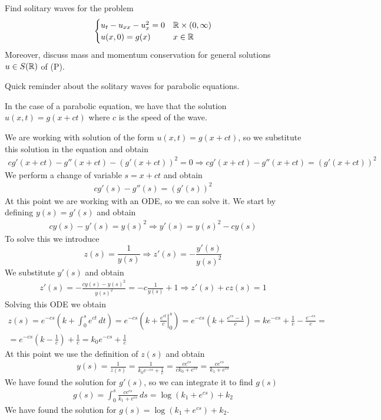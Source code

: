 \newpage
\begin{exercise}
    Find solitary waves for the problem
    \[
        \begin{cases}
            u_t - u_{xx} - u_x^2 = 0 & \mathbb{R} \times (0, \infty) \\
            u(x, 0) = g(x)           & x \in \mathbb{R}
        \end{cases}
    \]
    Moreover, discuss mass and momentum conservation for general solutions \(u \in
    S(\mathbb{R})\) of (P).
\end{exercise}
Quick reminder about the solitary waves for parabolic equations.
\begin{remark}
    In the case of a parabolic equation, we have that the solution \(u(x,t) =  g(x + ct)\) where \(c\) is the speed of the wave.
\end{remark}
We are working with solution of the form \(u(x,t) = g(x + ct)\), so we substitute this solution in the equation and obtain
\[
    \begin{split}
        cg'(x+ct) - g''(x+ct) - (g'(x+ct))^2 = 0 \Rightarrow cg'(x+ct) - g''(x+ct) = (g'(x+ct))^2
    \end{split}
\]
We perform a change of variable \(s = x + ct\) and obtain
\[
    \begin{split}
        cg'(s) - g''(s) = (g'(s))^2
    \end{split}
\]
At this point we are working with an ODE, so we can solve it. We start by
defining \(y(s) = g'(s)\) and obtain
\[
    \begin{split}
        cy(s) - y'(s) = y(s)^2 \Rightarrow y'(s) = y(s)^2 - cy(s)
    \end{split}
\]
To solve this we introduce
\[
    z(s) = \frac{1}{y(s)} \Rightarrow z'(s) = - \frac{y'(s)}{y(s)^2}
\]
We substitute \(y'(s)\) and obtain
\[
    \begin{split}
        z'(s) = - \frac{cy(s) - y(s)^2}{y(s)^2} = - c \frac{1}{y(s)} + 1 \Rightarrow z'(s) + c z(s) = 1
    \end{split}
\]
Solving this ODE we obtain
\[
    \begin{split}
        z(s) = e^{-cs} \left(k + \int_0^s e^{ct} \, dt\right) = e^{-cs} \left(k + \left. \frac{e^{ct}}{c} \right|_0^s\right) = e^{-cs} \left(k + \frac{e^{cs} - 1}{c}\right) = k e^{-cs} + \frac{1}{c} - \frac{e^{-cs}}{c} = \\
        = e^{-cs} \left(k - \frac{1}{c}\right) + \frac{1}{c} = k_0 e^{-cs} + \frac{1}{c}
    \end{split}
\]
At this point we use the definition of \(z(s)\) and obtain
\[
    \begin{split}
        y(s) = \frac{1}{z(s)} = \frac{1}{k_0 e^{-cs} + \frac{1}{c}} = \frac{c e^{cs}}{c k_0 + e^{cs}} = \frac{c e^{cs}}{k_1 + e^{cs}}
    \end{split}
\]
We have found the solution for \(g'(s)\), so we can integrate it to find
\(g(s)\)
\[
    \begin{split}
        g(s) = \int_0^s \frac{c e^{cs}}{k_1 + e^{cs}} \, ds = \log(k_1 + e^{cs}) + k_2
    \end{split}
\]
We have found the solution for \(g(s) = \log(k_1 + e^{cs}) + k_2\).

